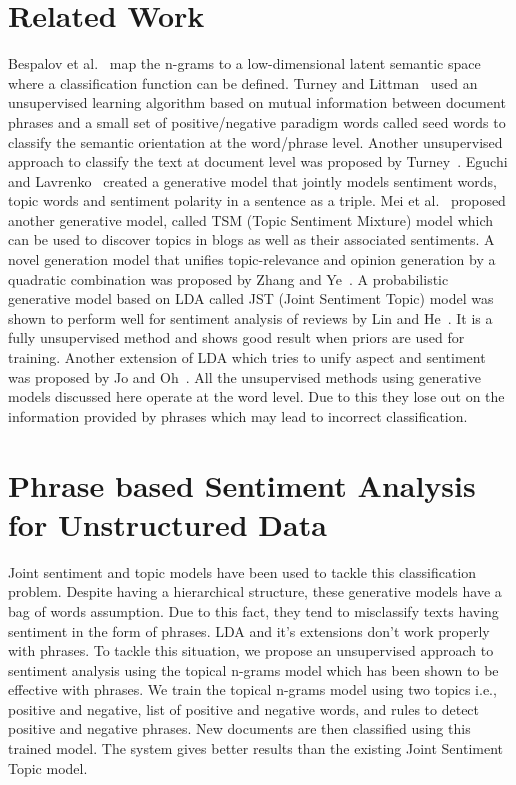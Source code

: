 \documentclass[11pt]{article}
\begin{document}
\section{Related Work}\label{survey}

Bespalov et al.~ map the n-grams to a low-dimensional latent 
semantic space where a classification function can be defined. Turney and Littman~
used an unsupervised learning algorithm based on mutual information between document phrases 
and a small set of positive/negative paradigm words called seed words to classify the semantic 
orientation at the word/phrase level. Another unsupervised approach to classify the text at 
document level was proposed by Turney~. Eguchi and 
Lavrenko~ created a generative model that jointly models sentiment
words, topic words and sentiment polarity in a sentence as a triple. Mei et al.~
proposed another generative model, called TSM (Topic Sentiment Mixture) model which can be used to discover 
topics in blogs as well as their associated sentiments. A novel generation model that 
unifies topic-relevance and opinion generation by a quadratic combination was proposed by 
Zhang and Ye~. A probabilistic generative model based on LDA
called JST (Joint Sentiment Topic) model was shown to perform well for sentiment analysis 
of reviews by Lin and He~. It is a fully unsupervised method
and shows good result when priors are used for training. Another extension of LDA which tries
to unify aspect and sentiment was proposed by Jo and Oh~. All the 
unsupervised methods using generative models discussed here operate at the word level. Due 
to this they lose out on the information provided by phrases which may lead to incorrect 
classification.

\section{Phrase based Sentiment Analysis for Unstructured Data}\label{phrasebased}

Joint sentiment and topic models have been used to tackle this classification problem.  
Despite having a hierarchical structure, these generative models have a bag of words assumption. Due to this fact, 
they tend to misclassify texts having sentiment in the form of phrases. LDA 
and it's extensions don't work properly with phrases. To tackle this situation, 
we propose an unsupervised approach to sentiment analysis using the topical n-grams model
which has been shown to be effective with phrases. We train the topical n-grams 
model using two topics i.e., positive and negative, list of positive and negative 
words, and rules to detect positive and negative phrases. New documents are then 
classified using this trained model. The system gives better results than the 
existing Joint Sentiment Topic model.
\end{document}
